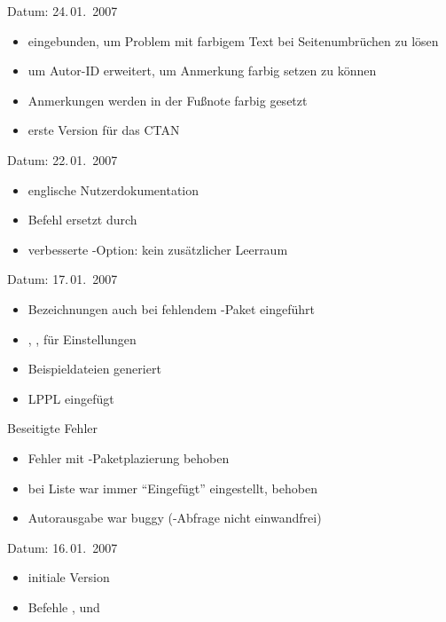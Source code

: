 
Datum: 24.\,01.~2007
\begin{itemize}
	\item {} eingebunden, um Problem mit farbigem Text bei Seitenumbrüchen zu lösen
	\item {} um Autor-ID erweitert, um Anmerkung farbig setzen zu können
	\item Anmerkungen werden in der Fußnote farbig gesetzt
	\item erste Version für das CTAN
\end{itemize}


Datum: 22.\,01.~2007
\begin{itemize}
	\item englische Nutzerdokumentation
	\item Befehl  ersetzt durch 
	\item verbesserte -Option: kein zusätzlicher Leerraum
\end{itemize}


Datum: 17.\,01.~2007
\begin{itemize}
	\item Bezeichnungen auch bei fehlendem -Paket eingeführt
	\item {}, ,  für Einstellungen
	\item Beispieldateien generiert
	\item LPPL eingefügt
\end{itemize}
Beseitigte Fehler
\begin{itemize}
	\item Fehler mit -Paketplazierung behoben
	\item bei Liste war immer "`Eingefügt"' eingestellt, behoben
	\item Autorausgabe war buggy (-Abfrage nicht einwandfrei)
\end{itemize}


Datum: 16.\,01.~2007
\begin{itemize}
	\item initiale Version
	\item Befehle ,  und 
\end{itemize}

